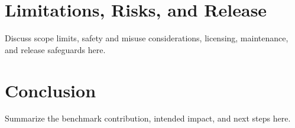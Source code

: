\documentclass{article}
\begin{document}
\section{Limitations, Risks, and Release}
Discuss scope limits, safety and misuse considerations, licensing, maintenance, and release safeguards here.

\section{Conclusion}
Summarize the benchmark contribution, intended impact, and next steps here.




\clearpage

\end{document}
